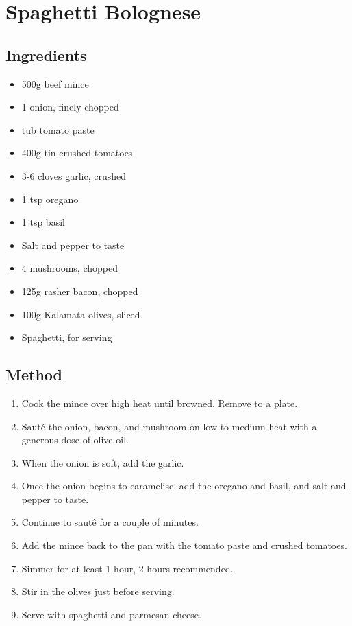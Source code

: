 \section{Spaghetti Bolognese}


\begin{multicols}{2}
  \subsection{Ingredients}
    \begin{itemize}
      \item 500g beef mince
      \item 1 onion, finely chopped
      \item {} tub tomato paste
      \item 400g tin crushed tomatoes
      \item 3-6 cloves garlic, crushed
      \item 1 tsp oregano
      \item 1 tsp basil
      \item Salt and pepper to taste
      \item 4 mushrooms, chopped
      \item 125g rasher bacon, chopped
      \item 100g Kalamata olives, sliced
      \item Spaghetti, for serving
    \end{itemize}
  \vfill\null
  \columnbreak
  \subsection{Method}
    \begin{enumerate}
      \item Cook the mince over high heat until browned. Remove to a plate.
      \item Saut\'e the onion, bacon, and mushroom on low to medium heat with a generous dose of olive oil.
      \item When the onion is soft, add the garlic.
      \item Once the onion begins to caramelise, add the oregano and basil, and salt and pepper to taste.
      \item Continue to saut\^e for a couple of minutes.
      \item Add the mince back to the pan with the tomato paste and crushed tomatoes.
      \item Simmer for at least 1 hour, 2 hours recommended.
      \item Stir in the olives just before serving.
      \item Serve with spaghetti and parmesan cheese.
    \end{enumerate}
  \end{multicols}
